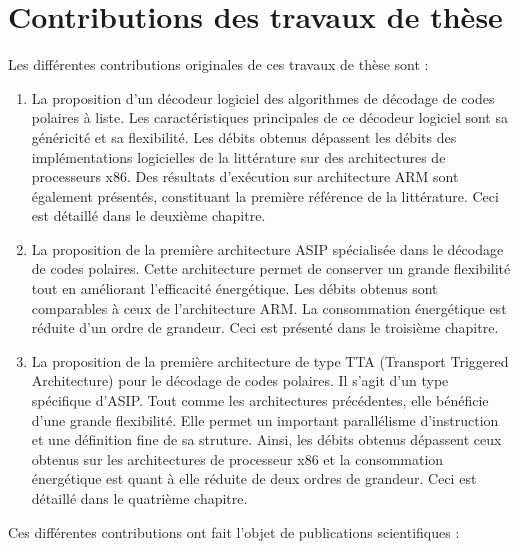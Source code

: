 \section*{Contributions des travaux de thèse}
Les différentes contributions originales de ces travaux de thèse sont : 
\begin{enumerate}
	\item La proposition d'un décodeur logiciel des algorithmes de décodage de codes polaires à liste. Les caractéristiques principales de ce décodeur logiciel sont sa généricité et sa flexibilité. Les débits obtenus dépassent les débits des implémentations logicielles de la littérature sur des architectures de processeurs x86. Des résultats d'exécution sur architecture ARM sont également présentés, constituant la première référence de la littérature. Ceci est détaillé dans le deuxième chapitre.
  	\item La proposition de la première architecture ASIP spécialisée dans le décodage de codes polaires. Cette architecture permet de conserver un grande flexibilité tout en améliorant l'efficacité énergétique. Les débits obtenus sont comparables à ceux de l'architecture ARM. La consommation énergétique est réduite d'un ordre de grandeur. Ceci est présenté dans le troisième chapitre.
  	\item La proposition de la première architecture de type TTA (Transport Triggered Architecture) pour le décodage de codes polaires. Il s'agit d'un type spécifique d'ASIP. Tout comme les architectures précédentes, elle bénéficie d'une grande flexibilité. Elle permet un important parallélisme d'instruction et une définition fine de sa struture. Ainsi, les débits obtenus dépassent ceux obtenus sur les architectures de processeur x86 et la consommation énergétique est quant à elle réduite de deux ordres de grandeur. Ceci est détaillé dans le quatrième chapitre.

\end{enumerate}

\vspace{1cm}
Ces différentes contributions ont fait l'objet de publications scientifiques : \\

